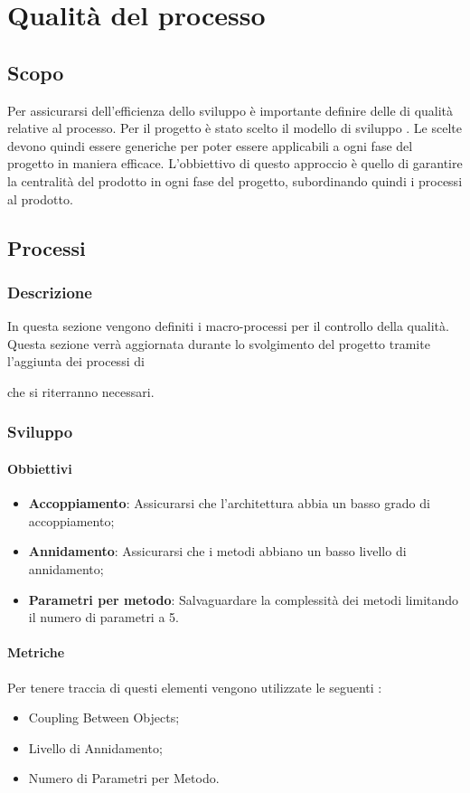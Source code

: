\section{Qualità del processo}

\subsection{Scopo}
Per assicurarsi dell'efficienza dello sviluppo è importante definire delle  di qualità relative al processo.
Per il progetto è stato scelto il modello di sviluppo .
Le  scelte devono quindi essere generiche per poter essere applicabili a ogni fase del progetto in maniera efficace.
L'obbiettivo di questo approccio è quello di garantire la centralità del prodotto in ogni fase del progetto, subordinando quindi i processi al prodotto.

\subsection{Processi}
\subsubsection{Descrizione}
In questa sezione vengono definiti i macro-processi per il controllo della qualità.
Questa sezione verrà aggiornata durante lo svolgimento del progetto tramite l'aggiunta dei processi di  che si riterranno necessari.

\subsubsection{Sviluppo}
\paragraph{Obbiettivi}
\begin{itemize}
\item \textbf{Accoppiamento}: Assicurarsi che l'architettura abbia un basso grado di accoppiamento;
\item \textbf{Annidamento}: Assicurarsi che i metodi abbiano un basso livello di annidamento;
\item \textbf{Parametri per metodo}: Salvaguardare la complessità dei metodi limitando il numero di parametri a 5.
\end{itemize}

\paragraph{Metriche}
Per tenere traccia di questi elementi vengono utilizzate le seguenti :
\begin{itemize}
\item Coupling Between Objects;
\item Livello di Annidamento;
\item Numero di Parametri per Metodo.
\end{itemize}

